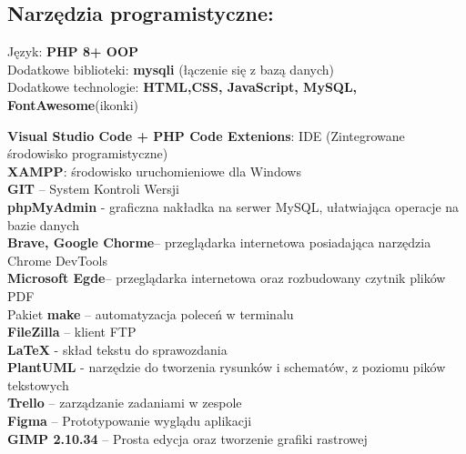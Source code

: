 \subsection{Narzędzia programistyczne:}
    \begin{flushleft}
        Język: \textbf{PHP 8+ OOP} \\
        Dodatkowe biblioteki: \textbf{mysqli} (łączenie się z bazą danych)\\
        Dodatkowe technologie: \textbf{HTML,CSS, JavaScript, MySQL, FontAwesome}(ikonki) \newline\newline

        \textbf{Visual Studio Code + PHP Code Extenions}: IDE (Zintegrowane środowisko programistyczne)\\
        \textbf{XAMPP}: środowisko uruchomieniowe dla Windows \\
        \textbf{GIT} – System Kontroli Wersji\\
        \textbf{phpMyAdmin} - graficzna nakładka na serwer MySQL, ułatwiająca operacje na bazie danych\\
        \textbf{Brave, Google Chorme}– przeglądarka internetowa posiadająca narzędzia Chrome DevTools \\
        \textbf{Microsoft Egde}– przeglądarka internetowa oraz rozbudowany czytnik plików PDF \\
        Pakiet \textbf{make} – automatyzacja poleceń w terminalu\\
        \textbf{FileZilla} – klient FTP\\
        \textbf{LaTeX} - skład tekstu do sprawozdania\\
        \textbf{PlantUML} - narzędzie do tworzenia rysunków i schematów, z poziomu pików tekstowych\\
        \textbf{Trello} – zarządzanie zadaniami w zespole\\
        \textbf{Figma} – Prototypowanie wyglądu aplikacji \\
        \textbf{GIMP 2.10.34} – Prosta edycja oraz tworzenie grafiki rastrowej \\


    \end{flushleft}
\pagebreak

